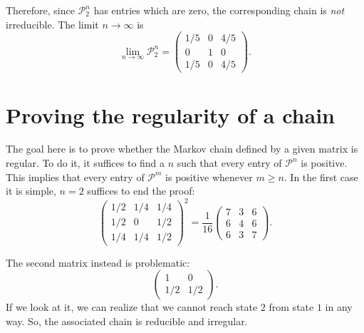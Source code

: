 Therefore, since $\mathcal{P}_{2}^{n}$ has entries which are zero, the
corresponding chain is \emph{not} irreducible. The limit $n \to \infty$ is
\begin{equation}
  \lim_{n \to \infty} \mathcal{P}_{2}^{n} =
  \begin{pmatrix}
    1/5 & 0 & 4/5 \\
    0 & 1 & 0 \\
    1/5 & 0 & 4/5
  \end{pmatrix}.
\end{equation}

\section{Proving the regularity of a chain}
The goal here is to prove whether the Markov chain defined by a given matrix is
regular. To do it, it suffices to find a $n$ such that every entry of
$\mathcal{P}^{n}$ is positive. This implies that every entry of
$\mathcal{P}^{m}$ is positive whenever $m \geq n$. In the first case it is
simple, $n = 2$ suffices to end the proof:
\begin{equation}
  \begin{pmatrix}
    1/2 & 1/4 & 1/4 \\
    1/2 &  0  & 1/2 \\
    1/4 & 1/4 & 1/2
  \end{pmatrix}^2
  = \frac{1}{16}
  \begin{pmatrix}
    7 & 3 & 6 \\
    6 & 4 & 6 \\
    6 & 3 & 7
  \end{pmatrix}.
\end{equation}

The second matrix instead is problematic:
\begin{equation}
  \begin{pmatrix}
    1 & 0 \\
    1/2 & 1/2
  \end{pmatrix}.
\end{equation}
If we look at it, we can realize that we cannot reach state $2$ from state $1$
in any way. So, the associated chain is reducible and irregular.

